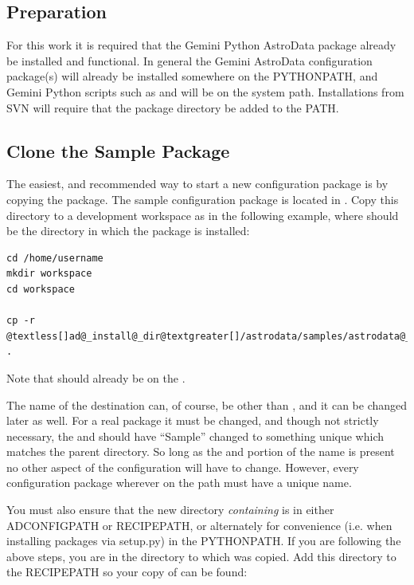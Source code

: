 \documentclass[letterpaper,10pt,english]{sphinxmanual}
\begin{document}
\subsection{Preparation}
\label{startingTheConfig:preparation}
For this work it is required that the Gemini Python AstroData package already
be installed and
functional. In general the Gemini AstroData configuration package(s) will
already
be installed somewhere on the PYTHONPATH, and Gemini Python scripts such
as  and
 will be on the system path.  Installations from SVN will
require that the  package directory be added to the PATH.


\subsection{Clone the Sample Package}
\label{startingTheConfig:clone-the-sample-package}
The easiest, and recommended way to start a new configuration package is by copying the
 package. The sample configuration package is located in
. Copy this directory to a development workspace
as in the following example, where  should be the directory in
which the  package is installed:

\begin{Verbatim}[commandchars=@\[\]]
cd /home/username
mkdir workspace
cd workspace

cp -r @textless[]ad@_install@_dir@textgreater[]/astrodata/samples/astrodata@_Sample .
\end{Verbatim}

Note that  should already be on the .

The name of the destination can, of course, be other than ,
and it can be changed later as well. For a real package it must be changed, and
though not strictly necessary, the  and  should
have ``Sample'' changed to something unique which matches the parent
 directory. So long as the  and 
portion of the name is present no other aspect of the configuration will have to
change. However, every configuration package wherever on the
path must have a unique name.

You must also ensure that the new directory \emph{containing}
 is in either ADCONFIGPATH or RECIPEPATH, or alternately
for convenience (i.e. when installing packages via setup.py) in the PYTHONPATH.
If you are following the above steps, you are in the directory to which
 was copied. Add this directory to the RECIPEPATH so your copy
of  can be found:
\end{document}
